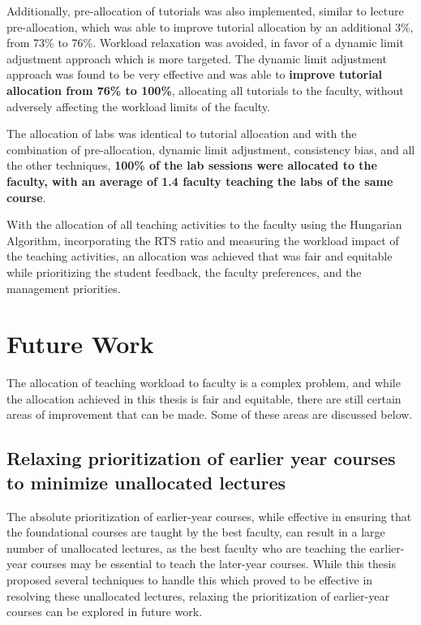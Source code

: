 Additionally, pre-allocation of tutorials was also implemented, similar to lecture pre-allocation, which was able to improve tutorial allocation by an additional 3\%, from 73\% to 76\%. Workload relaxation was avoided, in favor of a dynamic limit adjustment approach which is more targeted. The dynamic limit adjustment approach was found to be very effective and was able to \textbf{improve tutorial allocation from 76\% to 100\%}, allocating all tutorials to the faculty, without adversely affecting the workload limits of the faculty.

The allocation of labs was identical to tutorial allocation and with the combination of pre-allocation, dynamic limit adjustment, consistency bias, and all the other techniques, \textbf{100\% of the lab sessions were allocated to the faculty, with an average of 1.4 faculty teaching the labs of the same course}.

With the allocation of all teaching activities to the faculty using the Hungarian Algorithm, incorporating the RTS ratio and measuring the workload impact of the teaching activities, an allocation was achieved that was fair and equitable while prioritizing the student feedback, the faculty preferences, and the management priorities.

\section{Future Work}

The allocation of teaching workload to faculty is a complex problem, and while the allocation achieved in this thesis is fair and equitable, there are still certain areas of improvement that can be made. Some of these areas are discussed below.

\subsection{Relaxing prioritization of earlier year courses to minimize unallocated lectures}

The absolute prioritization of earlier-year courses, while effective in ensuring that the foundational courses are taught by the best faculty, can result in a large number of unallocated lectures, as the best faculty who are teaching the earlier-year courses may be essential to teach the later-year courses. While this thesis proposed several techniques to handle this which proved to be effective in resolving these unallocated lectures, relaxing the prioritization of earlier-year courses can be explored in future work.

